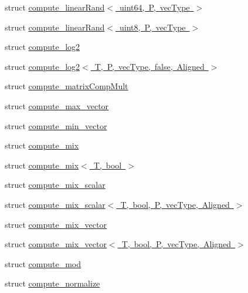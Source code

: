 \begin{DoxyCompactItemize}
\item 
struct \mbox{\hyperlink{structglm_1_1detail_1_1compute__linear_rand_3_01uint64_00_01_p_00_01vec_type_01_4}{compute\+\_\+linear\+Rand$<$ uint64, P, vec\+Type $>$}}
\item 
struct \mbox{\hyperlink{structglm_1_1detail_1_1compute__linear_rand_3_01uint8_00_01_p_00_01vec_type_01_4}{compute\+\_\+linear\+Rand$<$ uint8, P, vec\+Type $>$}}
\item 
struct \mbox{\hyperlink{structglm_1_1detail_1_1compute__log2}{compute\+\_\+log2}}
\item 
struct \mbox{\hyperlink{structglm_1_1detail_1_1compute__log2_3_01_t_00_01_p_00_01vec_type_00_01false_00_01_aligned_01_4}{compute\+\_\+log2$<$ T, P, vec\+Type, false, Aligned $>$}}
\item 
struct \mbox{\hyperlink{structglm_1_1detail_1_1compute__matrix_comp_mult}{compute\+\_\+matrix\+Comp\+Mult}}
\item 
struct \mbox{\hyperlink{structglm_1_1detail_1_1compute__max__vector}{compute\+\_\+max\+\_\+vector}}
\item 
struct \mbox{\hyperlink{structglm_1_1detail_1_1compute__min__vector}{compute\+\_\+min\+\_\+vector}}
\item 
struct \mbox{\hyperlink{structglm_1_1detail_1_1compute__mix}{compute\+\_\+mix}}
\item 
struct \mbox{\hyperlink{structglm_1_1detail_1_1compute__mix_3_01_t_00_01bool_01_4}{compute\+\_\+mix$<$ T, bool $>$}}
\item 
struct \mbox{\hyperlink{structglm_1_1detail_1_1compute__mix__scalar}{compute\+\_\+mix\+\_\+scalar}}
\item 
struct \mbox{\hyperlink{structglm_1_1detail_1_1compute__mix__scalar_3_01_t_00_01bool_00_01_p_00_01vec_type_00_01_aligned_01_4}{compute\+\_\+mix\+\_\+scalar$<$ T, bool, P, vec\+Type, Aligned $>$}}
\item 
struct \mbox{\hyperlink{structglm_1_1detail_1_1compute__mix__vector}{compute\+\_\+mix\+\_\+vector}}
\item 
struct \mbox{\hyperlink{structglm_1_1detail_1_1compute__mix__vector_3_01_t_00_01bool_00_01_p_00_01vec_type_00_01_aligned_01_4}{compute\+\_\+mix\+\_\+vector$<$ T, bool, P, vec\+Type, Aligned $>$}}
\item 
struct \mbox{\hyperlink{structglm_1_1detail_1_1compute__mod}{compute\+\_\+mod}}
\item 
struct \mbox{\hyperlink{structglm_1_1detail_1_1compute__normalize}{compute\+\_\+normalize}}
\item 

\end{DoxyCompactItemize}
